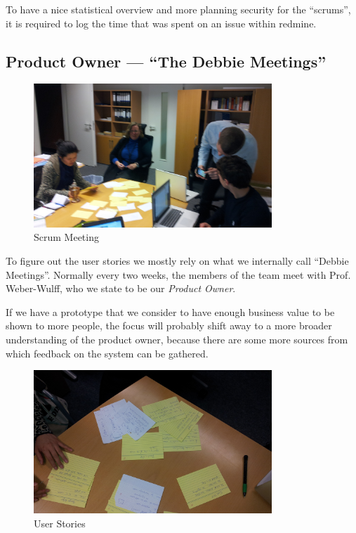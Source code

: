 To have a nice statistical overview and more planning security for the \enquote{scrums}, it is required to log the time 
that was spent on an issue within redmine.




\subsection{Product Owner --- \enquote{The Debbie Meetings}}


\begin{figure}[!h]
  \centering
    \includegraphics[width=0.8\textwidth]{images/2011-11-15-user-stories-6.jpg}
  \caption{Scrum Meeting}
  \label{fig:scrumming}
\end{figure}

To figure out the user stories we mostly rely on what we internally call \enquote{Debbie Meetings}.
Normally every two weeks, the members of the team meet with Prof. Weber-Wulff, who we state to be our \textit{Product
Owner}.

If we have a prototype that we consider to have enough business value to be shown to more people, the focus will 
probably shift away to a more broader understanding of the product owner, because there are some more sources from
which feedback on the system can be gathered.

\begin{figure}[!h]
  \centering
    \includegraphics[width=0.8\textwidth]{images/2011-11-15-user-stories-4.jpg}
  \caption{User Stories}
  \label{fig:userStories}
\end{figure}

